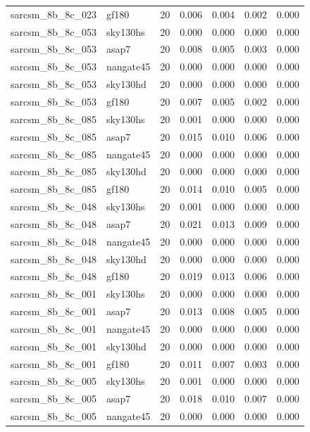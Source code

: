 \begin{tabular}{llrrrrr}
sarcsm\_8b\_8c\_023 & gf180 & 20 & 0.006 & 0.004 & 0.002 & 0.000 \\
sarcsm\_8b\_8c\_053 & sky130hs & 20 & 0.000 & 0.000 & 0.000 & 0.000 \\
sarcsm\_8b\_8c\_053 & asap7 & 20 & 0.008 & 0.005 & 0.003 & 0.000 \\
sarcsm\_8b\_8c\_053 & nangate45 & 20 & 0.000 & 0.000 & 0.000 & 0.000 \\
sarcsm\_8b\_8c\_053 & sky130hd & 20 & 0.000 & 0.000 & 0.000 & 0.000 \\
sarcsm\_8b\_8c\_053 & gf180 & 20 & 0.007 & 0.005 & 0.002 & 0.000 \\
sarcsm\_8b\_8c\_085 & sky130hs & 20 & 0.001 & 0.000 & 0.000 & 0.000 \\
sarcsm\_8b\_8c\_085 & asap7 & 20 & 0.015 & 0.010 & 0.006 & 0.000 \\
sarcsm\_8b\_8c\_085 & nangate45 & 20 & 0.000 & 0.000 & 0.000 & 0.000 \\
sarcsm\_8b\_8c\_085 & sky130hd & 20 & 0.000 & 0.000 & 0.000 & 0.000 \\
sarcsm\_8b\_8c\_085 & gf180 & 20 & 0.014 & 0.010 & 0.005 & 0.000 \\
sarcsm\_8b\_8c\_048 & sky130hs & 20 & 0.001 & 0.000 & 0.000 & 0.000 \\
sarcsm\_8b\_8c\_048 & asap7 & 20 & 0.021 & 0.013 & 0.009 & 0.000 \\
sarcsm\_8b\_8c\_048 & nangate45 & 20 & 0.000 & 0.000 & 0.000 & 0.000 \\
sarcsm\_8b\_8c\_048 & sky130hd & 20 & 0.000 & 0.000 & 0.000 & 0.000 \\
sarcsm\_8b\_8c\_048 & gf180 & 20 & 0.019 & 0.013 & 0.006 & 0.000 \\
sarcsm\_8b\_8c\_001 & sky130hs & 20 & 0.000 & 0.000 & 0.000 & 0.000 \\
sarcsm\_8b\_8c\_001 & asap7 & 20 & 0.013 & 0.008 & 0.005 & 0.000 \\
sarcsm\_8b\_8c\_001 & nangate45 & 20 & 0.000 & 0.000 & 0.000 & 0.000 \\
sarcsm\_8b\_8c\_001 & sky130hd & 20 & 0.000 & 0.000 & 0.000 & 0.000 \\
sarcsm\_8b\_8c\_001 & gf180 & 20 & 0.011 & 0.007 & 0.003 & 0.000 \\
sarcsm\_8b\_8c\_005 & sky130hs & 20 & 0.001 & 0.000 & 0.000 & 0.000 \\
sarcsm\_8b\_8c\_005 & asap7 & 20 & 0.018 & 0.010 & 0.007 & 0.000 \\
sarcsm\_8b\_8c\_005 & nangate45 & 20 & 0.000 & 0.000 & 0.000 & 0.000 \\

\end{tabular}

